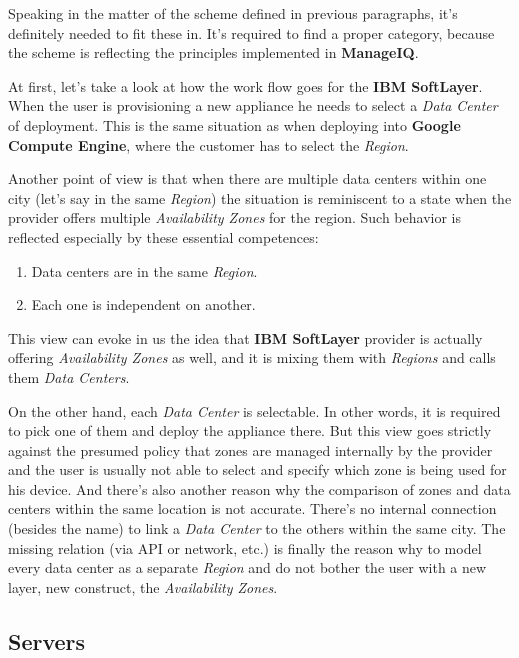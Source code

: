 Speaking in the matter of the scheme defined in previous paragraphs, it's definitely needed to fit these in. It's required to find a proper category, because the scheme is reflecting the principles implemented in \textbf{ManageIQ}.

At first, let's take a look at how the work flow goes for the \textbf{IBM SoftLayer}. When the user is provisioning a new appliance he needs to select a \emph{Data Center} of deployment. This is the same situation as when deploying into \textbf{Google Compute Engine}, where the customer has to select the \emph{Region}.

Another point of view is that when there are multiple data centers within one city (let's say in the same \emph{Region}) the situation is reminiscent to a state when the provider offers multiple \emph{Availability Zones} for the region. Such behavior is reflected especially by these essential competences:

\begin{enumerate}
	\item Data centers are in the same \emph{Region}.
	\item Each one is independent on another.
\end{enumerate}

This view can evoke in us the idea that \textbf{IBM SoftLayer} provider is actually offering \emph{Availability Zones} as well, and it is mixing them with \emph{Regions} and calls them \emph{Data Centers}.

On the other hand, each \emph{Data Center} is selectable. In other words, it is required to pick one of them and deploy the appliance there. But this view goes strictly against the presumed policy that zones are managed internally by the provider and the user is usually not able to select and specify which zone is being used for his device. And there's also another reason why the comparison of zones and data centers within the same location is not accurate. There's no internal connection (besides the name) to link a \emph{Data Center} to the others within the same city. The missing relation (via API or network, etc.) is finally the reason why to model every data center as a separate \emph{Region} and do not bother the user with a new layer, new construct, the \emph{Availability Zones}.

\subsection{Servers}
\label{sub:Servers}

